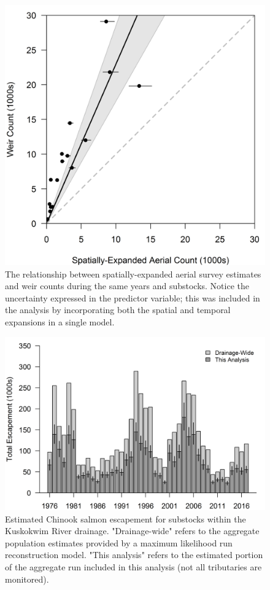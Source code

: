\documentclass[12pt,]{book}
\theoremstyle{definition}
\theoremstyle{definition}
\theoremstyle{definition}
\theoremstyle{remark}
\begin{document}
\begin{figure}
  \centering
  \includegraphics{img/Ch4/obs-correct.png}
  \caption{The relationship between spatially-expanded aerial survey estimates and weir counts during the same years and substocks. Notice the uncertainty expressed in the predictor variable; this was included in the analysis by incorporating both the spatial and temporal expansions in a single model.}
  \label{fig:obs-correct}
\end{figure}

\clearpage

\begin{figure}
  \centering
  \includegraphics{img/Ch4/obs-fraction.png}
  \caption{Estimated Chinook salmon escapement for substocks within the Kuskokwim River drainage. "Drainage-wide" refers to the aggregate population estimates provided by a maximum likelihood run reconstruction model. "This analysis" refers to the estimated portion of the aggregate run included in this analysis (not all tributaries are monitored).}
  \label{fig:obs-fraction}
\end{figure}
\end{document}

